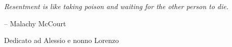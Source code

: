 
\cleardoublepage
{}
\thispagestyle{empty}

\epigraph{\itshape Resentment is like taking poison and waiting for the other person to die.}{-- Malachy McCourt} 

\vspace*{5cm}


\begin{center}
Dedicato ad Alessio e nonno Lorenzo
\end{center}
